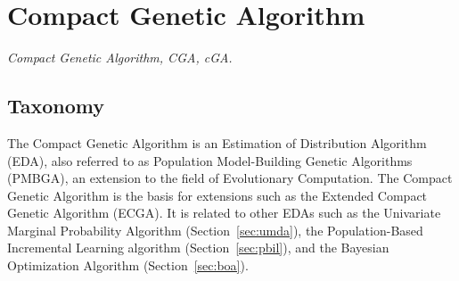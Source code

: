 

\section{Compact Genetic Algorithm} 
\label{sec:compact_genetic_algorithm}

\emph{Compact Genetic Algorithm, CGA, cGA.}

\subsection{Taxonomy}
The Compact Genetic Algorithm is an Estimation of Distribution Algorithm (EDA), also referred to as Population Model-Building Genetic Algorithms (PMBGA), an extension to the field of Evolutionary Computation.
The Compact Genetic Algorithm is the basis for extensions such as the Extended Compact Genetic Algorithm (ECGA).
It is related to other EDAs such as the Univariate Marginal Probability Algorithm (Section~\ref{sec:umda}), the Population-Based Incremental Learning algorithm (Section~\ref{sec:pbil}), and the Bayesian Optimization Algorithm (Section~\ref{sec:boa}).

